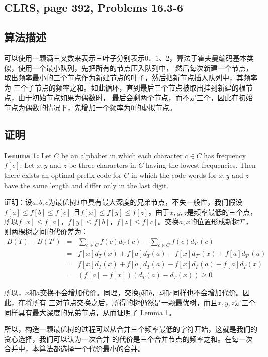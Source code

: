 \documentclass{article}
\begin{document}
\begin{CJK}{UTF8}{gbsn}
\section{CLRS, page 392, Problems 16.3-6}
\subsection{算法描述}
可以使用一颗满三叉数来表示三叶子分别表示0、1、2，算法于霍夫曼编码基本类似，使用一个最小队列，先把所有的节点压入队列中，
然后每次新建一个节点，取出频率最小的三个节点作为新建节点的叶子，然后把新节点插入队列中，其频率为
三个子节点的频率之和。如此循环，直到最后三个节点被取出挂到新建的根节点，由于初始节点如果为偶数时，
最后会剩两个节点，而不是三个，因此在初始节点为偶数的情况下，先增加一个频率为0的虚拟节点。
\subsection{证明}
\textbf{Lemma 1:} Let $C$ be an alphabet in which each character $c \in C$ has
frequency $f[c]$. Let $x,y$ and $z$ be three characters in $C$ having the lowest
frequencies. Then there exists an optimal prefix code for $C$ in which the code
words for $x,y$ and $z$ have the same length and differ only in the last
digit.\newline

证明：设$a,b,c$为最优树$T$中具有最大深度的兄弟节点，不失一般性，我们假设$f[a]\leq f[b] \leq f[c]$
且$f[x]\leq f[y] \leq f[z]$。由于$x,y,z$是频率最低的三个点，所以$f[x]\leq f[a]$，$f[y]\leq
f[b]$，$f[z]\leq f[c]$。交换$a,x$的位置形成新树$T'$，则两棵树之间的代价差为：\newline
\begin{eqnarray*}
B(T) - B(T') &=& \sum_{c\in C}f(c)d_T(c) - \sum_{c\in C}f(c)d_{T'}(c)\\
 &=& f[x]d_T(x)+f[a]d_T(a) - f[x]d_{T'}(x)+f[a]d_{T'}(a)\\
 &=& f[x]d_T(x)+f[a]d_T(a) - f[x]d_T(a)+f[a]d_T(x)\\
 &=& (f[a]-f[x])(d_T(a)-d_T(x)) \geq 0
\end{eqnarray*}

所以，$x$和$a$交换不会增加代价。同理，交换$y$和$b$，$z$和$c$同样也不会增加代价。因此，在将所有
三对节点交换之后，所得的树仍然是一颗最优树，而且$x,y,z$是三个同样具有最大深度的兄弟节点，从而证明了
Lemma 1。

所以，构造一颗最优树的过程可以从合并三个频率最低的字符开始，这就是我们的贪心选择，我们可以认为一次合并
的代价是三个合并节点的频率之和。在每一次合并中，本算法都选择一个代价最小的合并。\newline


\end{CJK}
\end{document}
